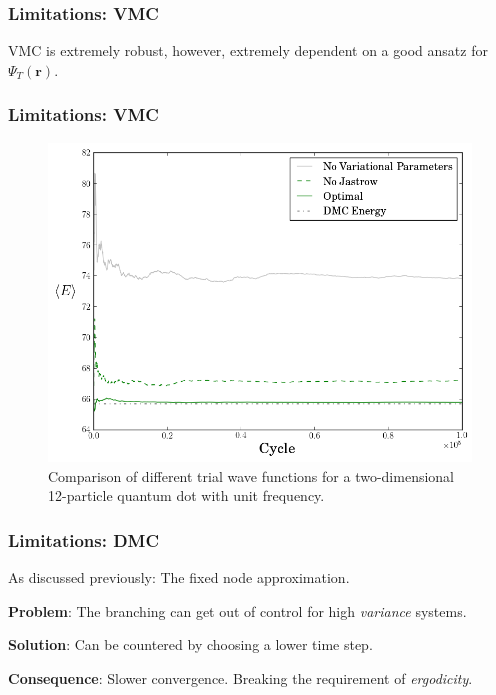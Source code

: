 \begin{frame}
 \frametitle{Limitations: VMC}
 
 VMC is extremely robust, however, extremely dependent on a good ansatz for $\Psi_T(\mathbf{r})$.
 
\end{frame}

\begin{frame}
 \frametitle{Limitations: VMC}
 
 \begin{figure}
  \begin{center}
   \includegraphics[scale=0.35]{../graphics/WFComp.png}
  \end{center}
  \caption{Comparison of different trial wave functions for a two-dimensional 12-particle quantum dot with unit frequency.}
 \end{figure}
 
\end{frame}


\begin{frame}
  \frametitle{Limitations: DMC}
  
  As discussed previously: The fixed node approximation.
  \shift
  
  \textbf{Problem}: The branching can get out of control for high \textit{variance} systems. 
  \shift
  
  \textbf{Solution}: Can be countered by choosing a lower time step. 
  \shift
  
  \textbf{Consequence}: Slower convergence. Breaking the requirement of \textit{ergodicity}.
  
\end{frame}

